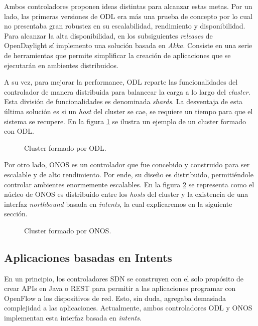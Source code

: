 Ambos controladores proponen ideas distintas para alcanzar estas metas. Por un lado, las primeras versiones de ODL era más una prueba de concepto por lo cual no presentaba gran robustez en su escalabilidad, rendimiento y disponibilidad. Para alcanzar la alta disponibilidad, en los subsiguientes \textit{releases} de OpenDaylight sí implemento una solución basada en \textit{Akka}. Consiste en una serie de herramientas que permite simplificar la creación de aplicaciones que se ejecutarán en ambientes distribuidos. 

A su vez, para mejorar la performance, ODL reparte las funcionalidades del controlador de manera distribuida para balancear la carga a lo largo del \textit{cluster}. Esta división de funcionalidades es denominada \textit{shards}. La desventaja de esta última solución es si un \textit{host} del cluster se cae, se requiere un tiempo para que el sistema se recupere. En la figura \ref{fig:ODLCluster} se ilustra un ejemplo de un cluster formado con ODL.       

\begin{figure}[th]
	\centering 
	\caption[ODL Clustering]{Cluster formado por ODL.}
	\label{fig:ODLCluster}
\end{figure}

Por otro lado, ONOS es un controlador que fue concebido y construido para ser escalable y de alto rendimiento. Por ende, su diseño es distribuido, permitiéndole controlar ambientes enormemente escalables. En la figura \ref{fig:ONOSCluster} se representa como el núcleo de ONOS es distribuido entre los \textit{hosts} del cluster y la existencia de una interfaz \textit{northbound} basada en \textit{intents}, la cual explicaremos en la siguiente sección.   
 
\begin{figure}[th]
	\centering 
	\caption[ONOS Clustering]{Cluster formado por ONOS.}
	\label{fig:ONOSCluster}
\end{figure}

\subsection{Aplicaciones basadas en Intents}
\label{subs:intents}

En un principio, los controladores SDN se construyen con el solo propósito de crear APIs en Java o REST para permitir a las aplicaciones programar con OpenFlow a los dispositivos de red. Esto, sin duda, agregaba demasiada complejidad a las aplicaciones. Actualmente, ambos controladores ODL y ONOS implementan esta interfaz basada en \textit{intents}.

